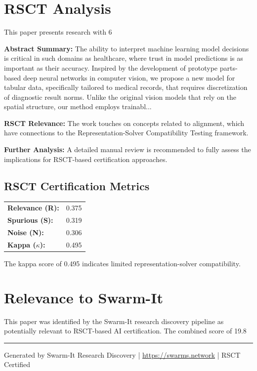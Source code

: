 \documentclass[11pt,a4paper]{article}
\begin{document}
\section{RSCT Analysis}
This paper presents research with 6%

\textbf{Abstract Summary:} The ability to interpret machine learning model decisions is critical in such domains as healthcare, where trust in model predictions is as important as their accuracy. Inspired by the development of prototype parts-based deep neural networks in computer vision, we propose a new model for tabular data, specifically tailored to medical records, that requires discretization of diagnostic result norms. Unlike the original vision models that rely on the spatial structure, our method employs trainabl...

\textbf{RSCT Relevance:} The work touches on concepts related to alignment, which have connections to the Representation-Solver Compatibility Testing framework.

\textbf{Further Analysis:} A detailed manual review is recommended to fully assess the implications for RSCT-based certification approaches.


\subsection*{RSCT Certification Metrics}
\begin{tabular}{ll}
\textbf{Relevance (R):} & 0.375 \\
\textbf{Spurious (S):} & 0.319 \\
\textbf{Noise (N):} & 0.306 \\
\textbf{Kappa ($\kappa$):} & 0.495 \\
\end{tabular}

The kappa score of 0.495 indicates limited representation-solver compatibility.


\section{Relevance to Swarm-It}
This paper was identified by the Swarm-It research discovery pipeline as potentially relevant to RSCT-based AI certification. The combined score of 19.8%

\vspace{1em}
\hrule
\vspace{0.5em}
\small{Generated by Swarm-It Research Discovery | \url{https://swarms.network} | RSCT Certified}
\end{document}
